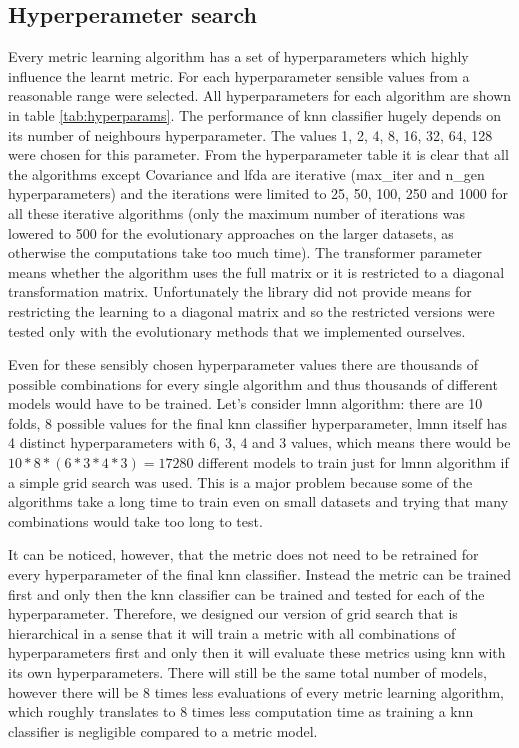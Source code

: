 \documentclass[12pt,a4paper]{report}
\begin{document}
\subsection{Hyperperameter search} \label{chap:exp:hypsearch}

Every metric learning algorithm has a set of hyperparameters which highly influence the learnt metric. For each hyperparameter sensible values from a reasonable range were selected. All hyperparameters for each algorithm are shown in table \ref{tab:hyperparams}. The performance of \ac{knn} classifier hugely depends on its number of neighbours hyperparameter. The values 1, 2, 4, 8, 16, 32, 64, 128 were chosen for this parameter. From the hyperparameter table it is clear that all the algorithms except Covariance and \ac{lfda} are iterative (max\_iter and n\_gen hyperparameters) and the iterations were limited to 25, 50, 100, 250 and 1000 for all these iterative algorithms (only the maximum number of iterations was lowered to 500 for the evolutionary approaches on the larger datasets, as otherwise the computations take too much time). The transformer parameter means whether the algorithm uses the full matrix or it is restricted to a diagonal transformation matrix. Unfortunately the library did not provide means for restricting the learning to a diagonal matrix and so the restricted versions were tested only with the evolutionary methods that we implemented ourselves. %



Even for these sensibly chosen hyperparameter values there are thousands of possible combinations for every single algorithm and thus thousands of different models would have to be trained. Let's consider \ac{lmnn} algorithm: there are 10 folds, 8 possible values for the final \ac{knn} classifier hyperparameter, \ac{lmnn} itself has 4 distinct hyperparameters with 6, 3, 4 and 3 values, which means there would be $10*8*(6*3*4*3)=17280$ different models to train just for \ac{lmnn} algorithm if a simple grid search was used. This is a major problem because some of the algorithms take a long time to train even on small datasets and trying that many combinations would take too long to test.

It can be noticed, however, that the metric does not need to be retrained for every hyperparameter of the final \ac{knn} classifier. Instead the metric can be trained first and only then the \ac{knn} classifier can be trained and tested for each of the hyperparameter. Therefore, we designed our version of grid search that is hierarchical in a sense that it will train a metric with all combinations of hyperparameters first and only then it will evaluate these metrics using \ac{knn} with its own hyperparameters. There will still be the same total number of models, however there will be 8 times less evaluations of every metric learning algorithm, which roughly translates to 8 times less computation time as training a \ac{knn} classifier is negligible compared to a metric model.
\end{document}
